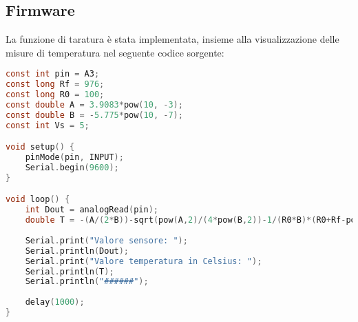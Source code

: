 \documentclass{article}
\begin{document}
\subsection{Firmware}
La funzione di taratura è stata implementata, insieme alla visualizzazione delle misure di temperatura nel seguente codice sorgente:
\begin{lstlisting}[language=C]
const int pin = A3;
const long Rf = 976;
const long R0 = 100;
const double A = 3.9083*pow(10, -3);
const double B = -5.775*pow(10, -7);
const int Vs = 5;

void setup() {
    pinMode(pin, INPUT);
    Serial.begin(9600);
}

void loop() {
    int Dout = analogRead(pin); 
    double T = -(A/(2*B))-sqrt(pow(A,2)/(4*pow(B,2))-1/(R0*B)*(R0+Rf-pow(2, 10)/Dout*Rf));
    
    Serial.print("Valore sensore: ");
    Serial.println(Dout);
    Serial.print("Valore temperatura in Celsius: ");
    Serial.println(T);
    Serial.println("######");
    
    delay(1000);
}
\end{lstlisting}
\end{document}
